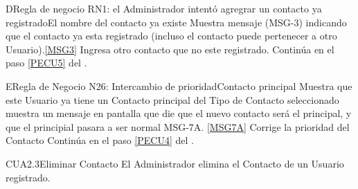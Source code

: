         \begin{UCtrayectoriaA}{D}{Regla de negocio RN1: el Administrador intentó agregrar un contacto ya registrado}{El nombre del contacto ya existe}
                        \UCpaso Muestra mensaje (MSG-3) indicando que el contacto ya esta registrado (incluso el contacto puede pertenecer a otro Usuario).\ref{MSG3}
			\UCpaso[\UCactor] Ingresa otro contacto que no este registrado.
			\UCpaso Continúa en el paso \ref{PECU5} del .
	\end{UCtrayectoriaA}

        \begin{UCtrayectoriaA}{E}{Regla de Negocio N26: Intercambio de prioridad}{Contacto principal}
                        \UCpaso Muestra que este Usuario ya tiene un Contacto principal del Tipo de Contacto seleccionado muestra un mensaje en pantalla que die que el nuevo contacto será el principal, y que el principial pasara  a ser normal MSG-7A. \ref{MSG7A}
			\UCpaso[\UCactor] Corrige la prioridad del Contacto
			\UCpaso Continúa en el paso \ref{PECU4} del .
	\end{UCtrayectoriaA}


	\begin{UseCase}{CUA2.3}{Eliminar Contacto }{El Administrador elimina el Contacto de un Usuario registrado.}
	\end{UseCase}


